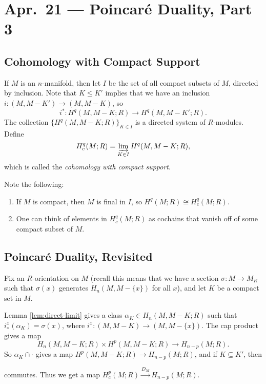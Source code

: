 \chapter{Apr.~21 --- Poincar\'e Duality, Part 3}

\section{Cohomology with Compact Support}

\begin{definition}
  If $M$ is an $n$-manifold, then let
  $I$ be the set of all compact subsets of
  $M$, directed by inclusion. Note that
  $K \le K'$ implies that we have
  an inclusion $i : (M, M - K') \to (M, M - K)$, so
  \[
    i^* : H^q(M, M - K; R)
    \longrightarrow H^q(M, M - K'; R).
  \]
  The collection $\{H^q(M, M - K; R)\}_{K \in I}$
  is a directed system of $R$-modules.
  Define
  \[
    H^q_c(M; R) = \varinjlim_{K \in I} H^q(M, M - K; R),
  \]
  which is called the
  \emph{cohomology with compact support}.
\end{definition}

\begin{remark}
  Note the following:
  \begin{enumerate}
    \item If $M$ is compact, then
      $M$ is final in $I$, so
      $H^q(M; R) \cong H^q_c(M; R)$.
    \item One can think of elements
      in $H^q_c(M; R)$ as cochains
      that vanish off of some compact
      subset of $M$.
  \end{enumerate}
\end{remark}

\section{Poincar\'e Duality, Revisited}
\begin{remark}
  Fix an $R$-orientation on $M$ (recall
  this means that we have a section
  $\sigma : M \to M_R$ such that $\sigma(x)$
  generates $H_n(M, M - \{x\})$ for all
  $x$), and let $K$ be a compact
  set in $M$.

  Lemma \ref{lem:direct-limit}
  gives a class $\alpha_K \in H_n(M, M - K; R)$
  such that $i^x_*(\alpha_K) = \sigma(x)$,
  where $i^x : (M, M - K) \to (M, M - \{x\})$. The cap product gives
  a map
  \[
    H_n(M, M - K; R) \times H^p(M, M - K; R)
    \longrightarrow
    H_{n - p}(M; R).
  \]
  So $\alpha_K \cap \cdot$ gives a map
  $H^p(M, M - K; R) \to H_{n - p}(M; R)$,
  and if $K \subseteq K'$, then
  \begin{center}
  \end{center}
  commutes.
  Thus we get a map $H^p_c(M; R) \overset{D_M}{\longrightarrow} H_{n - p}(M; R)$.
\end{remark}

